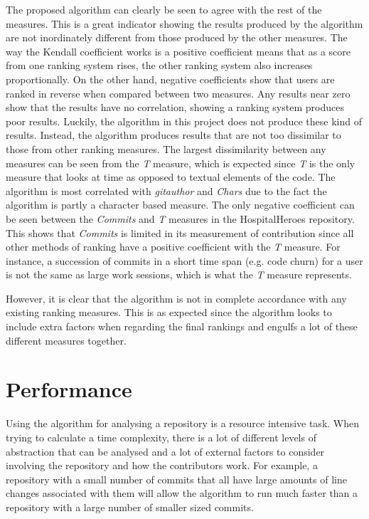 The proposed algorithm can clearly be seen to agree with the rest of the measures. This is a great indicator showing the results produced by the algorithm are not inordinately different from those produced by the other measures. The way the Kendall coefficient works is a positive coefficient means that as a score from one ranking system rises, the other ranking system also increases proportionally. On the other hand, negative coefficients show that users are ranked in reverse when compared between two measures. Any results near zero show that the results have no correlation, showing a ranking system produces poor results. Luckily, the algorithm in this project does not produce these kind of results. Instead, the algorithm produces results that are not too dissimilar to those from other ranking measures. The largest dissimilarity between any measures can be seen from the \textit{T} measure, which is expected since \textit{T} is the only measure that looks at time as opposed to textual elements of the code. The algorithm is most correlated with \textit{gitauthor} and \textit{Chars} due to the fact the algorithm is partly a character based measure. The only negative coefficient can be seen between the \textit{Commits} and \textit{T} measures in the HospitalHeroes repository. This shows that \textit{Commits} is limited in its measurement of contribution since all other methods of ranking have a positive coefficient with the \textit{T} measure. For instance, a succession of commits in a short time span (e.g. code churn) for a user is not the same as large work sessions, which is what the \textit{T} measure represents.

However, it is clear that the algorithm is not in complete accordance with any existing ranking measures. This is as expected since the algorithm looks to include extra factors when regarding the final rankings and engulfs a lot of these different measures together.

\section{Performance}

Using the algorithm for analysing a repository is a resource intensive task. When trying to calculate a time complexity, there is a lot of different levels of abstraction that can be analysed and a lot of external factors to consider involving the repository and how the contributors work. For example, a repository with a small number of commits that all have large amounts of line changes associated with them will allow the algorithm to run much faster than a repository with a large number of smaller sized commits. 

